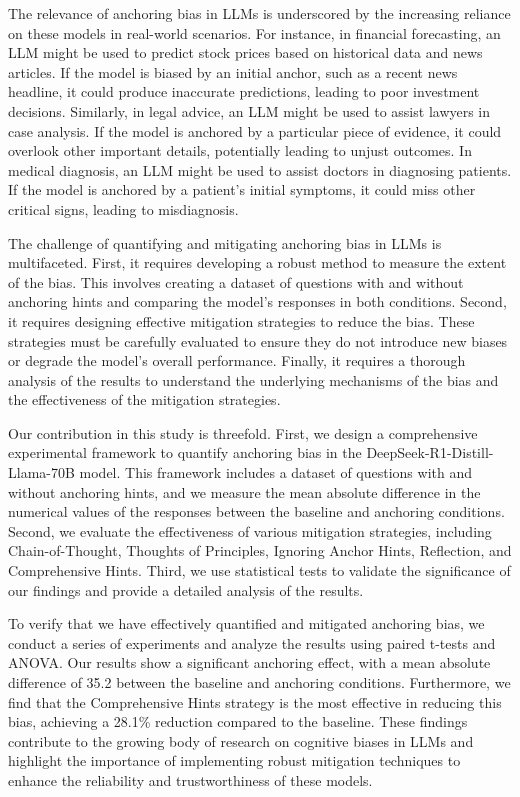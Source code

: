 \documentclass{article}
\begin{document}
The relevance of anchoring bias in LLMs is underscored by the increasing reliance on these models in real-world scenarios. For instance, in financial forecasting, an LLM might be used to predict stock prices based on historical data and news articles. If the model is biased by an initial anchor, such as a recent news headline, it could produce inaccurate predictions, leading to poor investment decisions. Similarly, in legal advice, an LLM might be used to assist lawyers in case analysis. If the model is anchored by a particular piece of evidence, it could overlook other important details, potentially leading to unjust outcomes. In medical diagnosis, an LLM might be used to assist doctors in diagnosing patients. If the model is anchored by a patient's initial symptoms, it could miss other critical signs, leading to misdiagnosis.

The challenge of quantifying and mitigating anchoring bias in LLMs is multifaceted. First, it requires developing a robust method to measure the extent of the bias. This involves creating a dataset of questions with and without anchoring hints and comparing the model's responses in both conditions. Second, it requires designing effective mitigation strategies to reduce the bias. These strategies must be carefully evaluated to ensure they do not introduce new biases or degrade the model's overall performance. Finally, it requires a thorough analysis of the results to understand the underlying mechanisms of the bias and the effectiveness of the mitigation strategies.

Our contribution in this study is threefold. First, we design a comprehensive experimental framework to quantify anchoring bias in the DeepSeek-R1-Distill-Llama-70B model. This framework includes a dataset of questions with and without anchoring hints, and we measure the mean absolute difference in the numerical values of the responses between the baseline and anchoring conditions. Second, we evaluate the effectiveness of various mitigation strategies, including Chain-of-Thought, Thoughts of Principles, Ignoring Anchor Hints, Reflection, and Comprehensive Hints. Third, we use statistical tests to validate the significance of our findings and provide a detailed analysis of the results.

To verify that we have effectively quantified and mitigated anchoring bias, we conduct a series of experiments and analyze the results using paired t-tests and ANOVA. Our results show a significant anchoring effect, with a mean absolute difference of 35.2 between the baseline and anchoring conditions. Furthermore, we find that the Comprehensive Hints strategy is the most effective in reducing this bias, achieving a 28.1\% reduction compared to the baseline. These findings contribute to the growing body of research on cognitive biases in LLMs and highlight the importance of implementing robust mitigation techniques to enhance the reliability and trustworthiness of these models.
\end{document}
